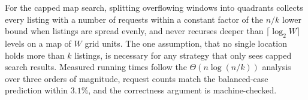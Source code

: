 \documentclass[conference]{IEEEtran}
\theoremstyle{spaced}
\begin{document}
For the capped map search, splitting overflowing windows into quadrants
collects every listing with a number of requests within a constant factor of
the $n/k$ lower bound when listings are spread evenly, and never recurses
deeper than $\lceil\log_2 W\rceil$ levels on a map of $W$ grid units. The
one assumption, that no single location holds more than $k$ listings, is
necessary for any strategy that only sees capped search results. Measured
running times follow the $\Theta(n\log(n/k))$ analysis over three orders of
magnitude, request counts match the balanced-case prediction within $3.1\%$,
and the correctness argument is machine-checked.




\onecolumn
\appendices


\end{document}
